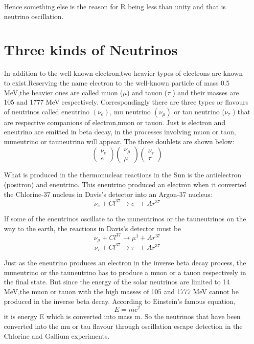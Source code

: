 Hence something else is the reason for R being less than unity and that
is neutrino oscillation.

\section{Three kinds of Neutrinos}

In addition to the well-known electron,two heavier types of electrons are
known to exist.Reserving the name electron to the well-known particle of
mass 0.5 MeV,the heavier ones are called muon ($\mu$) and tauon ($\tau$ ) and their
masses are 105 and 1777 MeV respectively. Correspondingly there are three
types or flavours of neutrinos called eneutrino $(\nu_{e})$, mu neutrino $(\nu_{\mu})$ or tau
neutrino ($\nu_{\tau}$ ) that are respective companions of electron,muon or tauon. Just
is electron and eneutrino are emitted in beta decay, in the processes involving
muon or taon, muneutrino or tauneutrino will appear. The three doublets
are shown below:
\begin{equation*}
\begin{pmatrix}
\nu_{e}\\
e
\end{pmatrix}
\begin{pmatrix}
\nu_{\mu}\\
\mu
\end{pmatrix}
\begin{pmatrix}
\nu_{\tau}\\
\tau
\end{pmatrix}
\end{equation*}

What is produced in the thermonuclear reactions in the Sun is the antielectron (positron) and eneutrino. This eneutrino produced an electron when
it converted the Chlorine-37 nucleus in Davis’s detector into an Argon-37 nucleus:
$$
\nu_{e} + Cl^{37} \rightarrow e^{-} + Ar^{37}
$$

If some of the eneutrinos oscillate to the muneutrinos or the tauneutrinos
on the way to the earth, the reactions in Davis’s detector must be
$$
\nu_{\mu} + Cl^{37} \rightarrow \mu^{1} + Ar^{37}
$$
$$
\nu_{\tau} + Cl^{37} \rightarrow \tau^{-} + Ar^{37}
$$

Just as the eneutrino produces an electron in the inverse beta decay process,
the muneutrino or the tauneutrino has to produce a muon or a tauon respectively in the final state. But since the energy of the solar neutrinos are
limited to 14 MeV,the muon or tauon with the high masses of 105 and 1777
MeV cannot be produced in the inverse beta decay. According to Einstein’s
famous equation,
$$
E=mc^{2}
$$
it is energy E which is converted into mass m. So the neutrinos that have
been converted into the mu or tau flavour through oscillation escape detection
in the Chlorine and Gallium experiments.

